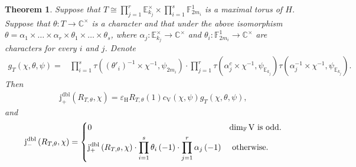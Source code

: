 \documentclass[12pt, reqno]{amsart}
\newtheorem{theorem}{Theorem}[section]
\theoremstyle{definition}
\theoremstyle{definition}
\theoremstyle{definition}
\newcommand{\cComplex}{\mathbb{C}}
\newcommand{\multiplicativegroup}[1]{#1^{\times}}
\newcommand{\hermitianSpace}{\mathrm{V}}
\newcommand{\fieldCharacter}{\psi}
\newcommand{\involution}[1]{#1^{c}}
\newcommand{\finiteField}{\mathbb{F}}
\newcommand{\quadraticExtension}{\mathbb{E}}
\newcommand{\finiteFieldExtension}[1]{\finiteField_{#1}}
\newcommand{\quadraticFieldExtension}[1]{\quadraticExtension_{#1}}
\newcommand{\dblPosVirtualJacobiSumScalar}[2]{\mathrm{j}_{+}^{\mathrm{dbl}}\left(#1, #2\right)}
\newcommand{\dblNegVirtualJacobiSumScalar}[2]{\mathrm{j}_{-}^{\mathrm{dbl}}\left(#1, #2\right)}
\newcommand{\GaussSumCharacter}[3]{\tau\left(#1 \times #2, #3\right)}
\newcommand{\algebraicGroup}[1]{\boldsymbol{\mathrm{#1}}}
\begin{document}
\begin{theorem}\label{thm:computation-of-doubling-gauss-sum-scalar-for-deligne-lusztig-characters}
	Suppose that $T \cong \prod_{j=1}^r \multiplicativegroup{\quadraticFieldExtension{k_j}} \times \prod_{i=1}^s \finiteFieldExtension{2m_i}^1$ is a maximal torus of $H$. Suppose that $\theta \colon T \to \multiplicativegroup{\cComplex}$ is a character and that under the above isomorphism $\theta = \alpha_1 \times \dots \times \alpha_r \times \theta_1 \times \dots \times \theta_s$, where $\alpha_j \colon \multiplicativegroup{\quadraticFieldExtension{k_j}} \to \multiplicativegroup{\cComplex}$ and $\theta_i \colon \finiteFieldExtension{2m_i}^1 \to \multiplicativegroup{\cComplex}$ are characters for every $i$ and $j$. Denote \begin{align*}
		g_T\left(\chi, \theta, \fieldCharacter\right)
		= & \prod_{i=1}^s \GaussSumCharacter{\left(\theta'_i\right)^{-1}}{\chi^{-1}}{\fieldCharacter_{2m_i}} \cdot \prod_{j=1}^r \GaussSumCharacter{\involution{\alpha_j}}{\chi^{-1}}{\fieldCharacter_{\quadraticFieldExtension{k_j}}} \GaussSumCharacter{\alpha_j^{-1}}{\chi^{-1}}{\fieldCharacter_{\quadraticFieldExtension{k_j}}}.
	\end{align*} Then
	\begin{align*}
		 \dblPosVirtualJacobiSumScalar{R_{T, \theta}}{\chi} = \varepsilon_{\algebraicGroup{H}} R_{T,\theta}\left(1\right) c_{\hermitianSpace}\left(\chi, \fieldCharacter\right) g_T\left(\chi, \theta, \fieldCharacter\right),
	\end{align*}
	and \begin{align*}
		\dblNegVirtualJacobiSumScalar{R_{T, \theta}}{\chi} = \begin{dcases}
			0 & \dim_{\finiteField} \hermitianSpace \text{ is odd.}\\
			\dblPosVirtualJacobiSumScalar{R_{T, \theta}}{\chi} \cdot \prod_{i=1}^s \theta_i\left(-1\right) \cdot \prod_{j=1}^r \alpha_j\left(-1\right) & \text{ otherwise.}
		\end{dcases}
	\end{align*}
\end{theorem}
\end{document}
